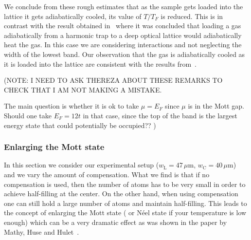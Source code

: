 \documentclass[11pt,letter]{article}
\begin{document}
We conclude from these rough estimates that as the sample gets loaded into the
lattice it gets adiabatically cooled, its value of $T/T_{F}$ is reduced.  This
is in contrast with the result obtained in~\cite{Kohl2006} where it was
concluded that loading a gas adiabatically from a harmonic trap to a deep
optical lattice would adiabatically heat the gas.   In this case we are
considering interactions and not neglecting the width of the lowest band.  Our
observation that the gas is adiabatically cooled as it is loaded into the
lattice are consistent with the results from~\cite{Paiva2011}.   

(NOTE: I NEED TO ASK THEREZA ABOUT THESE REMARKS TO CHECK THAT I AM NOT MAKING
A MISTAKE. 

The main question is whether it is ok to take $\mu=E_{F}$ since $\mu$ is in
the Mott gap.   Should one take  $E_{F}=12t$ in that case, since the top of the
band is the largest energy state that could potentially be occupied?? )


\subsubsection{ Enlarging the Mott state}  

In this section we consider our experimental setup
($w_{\text{L}}=47\,\mu\mathrm{m}$, $w_{\text{C}}=40\,\mu\mathrm{m}$)  and we
vary the amount of compensation.   What we find is that if no compensation is
used, then the number of atoms has to be very small in order to achieve
half-filling at the center.     On the other hand,  when using compensation one
can still hold a large number of atoms and maintain half-filling.   This leads
to the concept of enlarging the Mott state ( or N\'{e}el state if your
temperature is low enough)  which can be a very dramatic effect as was shown in
the paper by Mathy, Huse and Hulet~\cite{Mathy2012}.  
\end{document}
